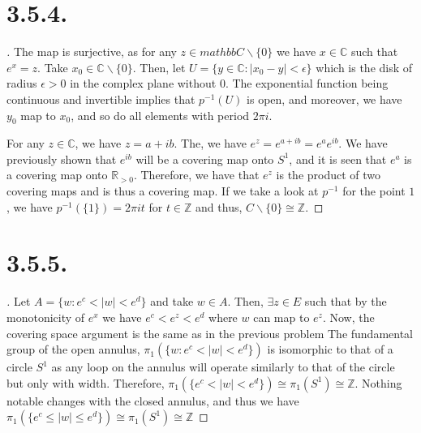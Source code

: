 \documentclass{article}
\begin{document}
\section*{3.5.4.} %
\begin{proof}[\unskip\nopunct]
  The map is surjective, as for any $z \in mathbb{C} \backslash \{0\}$ we have $x \in \mathbb{C}$ such that $e^x = z$. 
  Take $x_0 \in \mathbb{C} \backslash \{0\}$. Then, let $U = \{y \in \mathbb{C} : |x_0 - y| < \epsilon \}$ which is the disk of radius $\epsilon > 0$ in the complex plane without $0$.
  The exponential function being continuous and invertible implies that $p^{-1}(U)$ is open, and moreover, we have $y_0$ map to $x_0$, and so do all elements with period $2 \pi i$.  

  For any $z \in \mathbb{C}$, we have $z = a + ib$. The, we have $e^z = e^{a + ib} = e^ae^{ib}$. We have previously shown that $e^{ib}$ will be a covering map onto $S^1$, and it is seen that $e^a$ is a covering map onto $\mathbb{R}_{> 0}$. 
  Therefore, we have that $e^z$ is the product of two covering maps and is thus a covering map. If we take a look at $p^{-1}$ for the point $1$, we have $p^{-1}(\{1\}) =  2 \pi i t$ for $t \in \mathbb{Z}$ and thus, $C \backslash \{0\} \cong \mathbb{Z}$. 

\end{proof}


\section*{3.5.5.}
\begin{proof}[\unskip\nopunct]
   Let $A = \{w : e^c < |w| < e^d \}$ and take $w \in A$. Then, $\exists z \in E$ such that by the monotonicity of $e^x$ we have $e^c < e^z < e^d$ where $w$ can map to $e^z$. Now, the covering space argument is the same as in the previous problem
   The fundamental group of the open annulus, $\pi_1(\{w : e^c < |w| < e^d \})$ is isomorphic to that of a circle $S^1$ as any loop on the annulus will operate similarly to that of the circle but only with width. Therefore, $\pi_1(\{e^c < |w| < e^d \}) \cong \pi_1(S^1) \cong \mathbb{Z}$. 
   Nothing notable changes with the closed annulus, and thus we have $\pi_1(\{e^c \leq |w| \leq e^d \}) \cong \pi_1(S^1) \cong \mathbb{Z}$
\end{proof}
\end{document}
